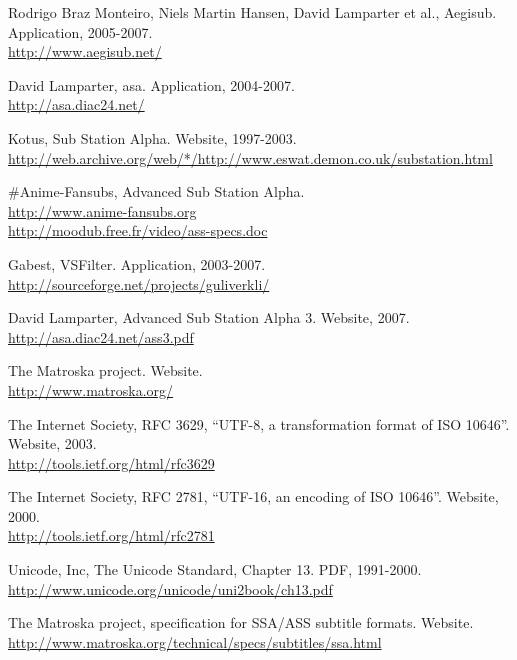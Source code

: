 \documentclass{spec}
\begin{document}
\newpage
{}
\begin{thebibliography}{1}

 Rodrigo Braz Monteiro, Niels Martin Hansen, David Lamparter et al., Aegisub. Application, 2005-2007.\\
\url{http://www.aegisub.net/}

 David Lamparter, asa. Application, 2004-2007.\\
\url{http://asa.diac24.net/}

 Kotus, Sub Station Alpha. Website, 1997-2003.\\
\url{http://web.archive.org/web/*/http://www.eswat.demon.co.uk/substation.html}

 \#Anime-Fansubs, Advanced Sub Station Alpha.\\
\url{http://www.anime-fansubs.org}\\
\url{http://moodub.free.fr/video/ass-specs.doc}

 Gabest, VSFilter. Application, 2003-2007.\\
\url{http://sourceforge.net/projects/guliverkli/}

 David Lamparter, Advanced Sub Station Alpha 3. Website, 2007.\\
\url{http://asa.diac24.net/ass3.pdf}

 The Matroska project. Website.\\
\url{http://www.matroska.org/}

 The Internet Society, RFC 3629, ``UTF-8, a transformation format of ISO 10646''. Website, 2003.\\
\url{http://tools.ietf.org/html/rfc3629}

 The Internet Society, RFC 2781, ``UTF-16, an encoding of ISO 10646''. Website, 2000.\\
\url{http://tools.ietf.org/html/rfc2781}

 Unicode, Inc, The Unicode Standard, Chapter 13. PDF, 1991-2000.\\
\url{http://www.unicode.org/unicode/uni2book/ch13.pdf}

 The Matroska project, specification for SSA/ASS subtitle formats. Website.\\
\url{http://www.matroska.org/technical/specs/subtitles/ssa.html}

\end{thebibliography}
\end{document}
